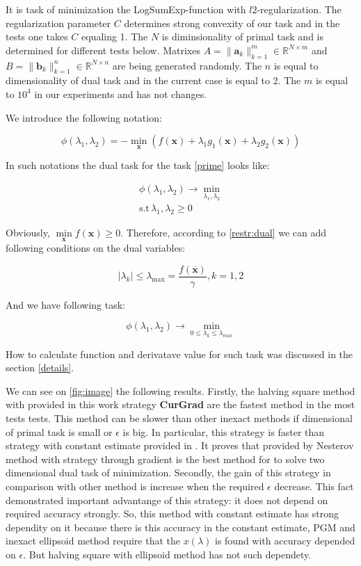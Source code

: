 \documentclass[12pt]{article}
\begin{document}
It is task of minimization the LogSumExp-function with $l2$-regularization. The regularization parameter $C$ determines strong convexity of our task and in the tests one takes $C$ equaling 1. The $N$ is diminsionality of primal task and is determined for different tests below. Matrixes $A = \|\textbf{a}_k\|_{k=1}^m \in\mathbb{R}^{N\times m}$ and $B = \|\textbf{b}_k\|_{k=1}^n \in\mathbb{R}^{N\times n}$ are being generated randomly. The $n$ is equal to dimensionality of dual task and in the current case is equal to 2. The $m$ is equal to $10^4$ in our experiments and has not changes.

We introduce the following notation:

\begin{equation}
\label{phi}
\phi(\lambda_1, \lambda_2) = -\min\limits_{\textbf{x}}\left(f(\textbf{x}) +\lambda_1 g_1(\textbf{x}) +\lambda_2g_2(\textbf{x})\right)
\end{equation}

In such notations the dual task for the task \ref{prime} looks like:

\begin{gather}
\phi(\lambda_1, \lambda_2) \rightarrow \min\limits_{\lambda_1, \lambda_2}\\
\text{s.t}\, \lambda_1, \lambda_2 \geq 0
\end{gather}
 
Obviously, $\min\limits_{\textbf{x}}f(\textbf{x}) \geq 0$. Therefore, according to \ref{restr:dual} we can add following conditions on the dual variables:

$$|\lambda_k| \leq \lambda_{\text{max}}=\frac{f(\overline{\textbf{x}})}{\gamma}, k=1,2$$

And we have following task:

$$\phi(\lambda_1, \lambda_2) \rightarrow \min_{0\leq\lambda_k\leq\lambda_{max}}$$

How to calculate function and derivatave value for such task was discussed in the section \ref{details}.

We can see on \ref{fig:image} the following results. Firstly, the halving square method with provided in this work strategy \textbf{CurGrad} are the fastest method in the most tests tests. This method can be slower than other inexact methods if dimensional of primal task is small or $\epsilon$ is big. In particular, this strategy is faster than strategy with constant estimate provided in \cite{Ston_Pas}. It proves that provided by Nesterov method with strategy through gradient is the best method for to solve two dimensional dual task of minimization. Secondly, the gain of this strategy in comparison with other method is increase when the required $\epsilon$ decrease. This fact demonstrated important advantange of this strategy: it does not depend on required accuracy strongly. So, this method with constant estimate has strong dependity on it because there is this accuracy in the constant estimate, PGM and inexact ellipsoid method require that the $x(\lambda)$ is found with accuracy depended on $\epsilon$. But halving square with ellipsoid method has not such dependety.
\end{document}
